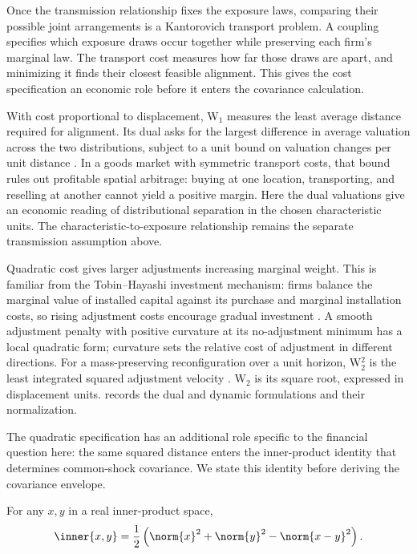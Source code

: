 Once the transmission relationship fixes the exposure laws, comparing their
possible joint arrangements is a Kantorovich transport problem.
A coupling specifies which exposure draws occur together while preserving
each firm's marginal law.
The transport cost measures how far those draws are apart, and minimizing it
finds their closest feasible alignment.
This gives the cost specification an economic role before it enters the
covariance calculation.

With cost proportional to displacement, W$_1$ measures the least average
distance required for alignment.
Its dual asks for the largest difference in average valuation across the
two distributions, subject to a unit bound on valuation changes per unit
distance \citep{panaretos_invitation_2020}.
In a goods market with symmetric transport costs, that bound rules out
profitable spatial arbitrage: buying at one location, transporting, and
reselling at another cannot yield a positive margin.
Here the dual valuations give an economic reading of distributional
separation in the chosen characteristic units.
The characteristic-to-exposure relationship remains the separate
transmission assumption above.

Quadratic cost gives larger adjustments increasing marginal weight.
This is familiar from the Tobin--Hayashi investment mechanism: firms balance
the marginal value of installed capital against its purchase and marginal
installation costs, so rising adjustment costs encourage gradual investment
\citep{hayashi_marginal_q_1982}.
A smooth adjustment penalty with positive curvature at its no-adjustment
minimum has a local quadratic form; curvature sets the relative cost of
adjustment in different directions.
For a mass-preserving reconfiguration over a unit horizon, W$_2^2$ is the
least integrated squared adjustment velocity
\citep{benamou_brenier_2000,santambrogio_optimal_transport_2015}.
W$_2$ is its square root, expressed in displacement units.
 records the dual and dynamic
formulations and their normalization.

The quadratic specification has an additional role specific to the financial
question here: the same squared distance enters the inner-product identity
that determines common-shock covariance.
We state this identity before deriving the covariance envelope.

\begin{lemma}\label{lem:polarization}
  For any $x,y$ in a real inner-product space,
  \begin{equation}\label{eq:polarization}
    \inner{x,y}
    =\frac12\left(\norm{x}^2+\norm{y}^2-\norm{x-y}^2\right).
  \end{equation}
\end{lemma}

